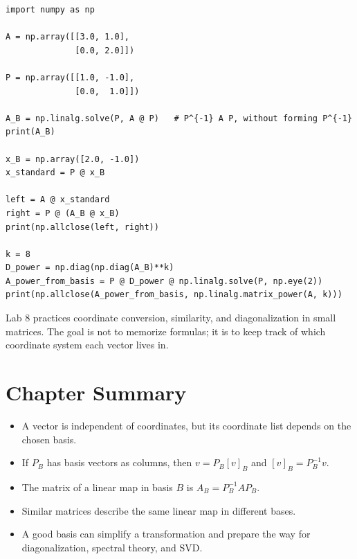 \begin{lstlisting}
import numpy as np

A = np.array([[3.0, 1.0],
              [0.0, 2.0]])

P = np.array([[1.0, -1.0],
              [0.0,  1.0]])

A_B = np.linalg.solve(P, A @ P)   # P^{-1} A P, without forming P^{-1}
print(A_B)

x_B = np.array([2.0, -1.0])
x_standard = P @ x_B

left = A @ x_standard
right = P @ (A_B @ x_B)
print(np.allclose(left, right))

k = 8
D_power = np.diag(np.diag(A_B)**k)
A_power_from_basis = P @ D_power @ np.linalg.solve(P, np.eye(2))
print(np.allclose(A_power_from_basis, np.linalg.matrix_power(A, k)))
\end{lstlisting}

\begin{labbox}
Lab 8 practices coordinate conversion, similarity, and diagonalization in
small matrices. The goal is not to memorize formulas; it is to keep track of
which coordinate system each vector lives in.
\end{labbox}

\section*{Chapter Summary}

\begin{itemize}
  \item A vector is independent of coordinates, but its coordinate list depends
        on the chosen basis.
  \item If $P_B$ has basis vectors as columns, then $v=P_B[v]_B$ and
        $[v]_B=P_B^{-1}v$.
  \item The matrix of a linear map in basis $B$ is $A_B=P_B^{-1}AP_B$.
  \item Similar matrices describe the same linear map in different bases.
  \item A good basis can simplify a transformation and prepare the way for
        diagonalization, spectral theory, and SVD.
\end{itemize}


